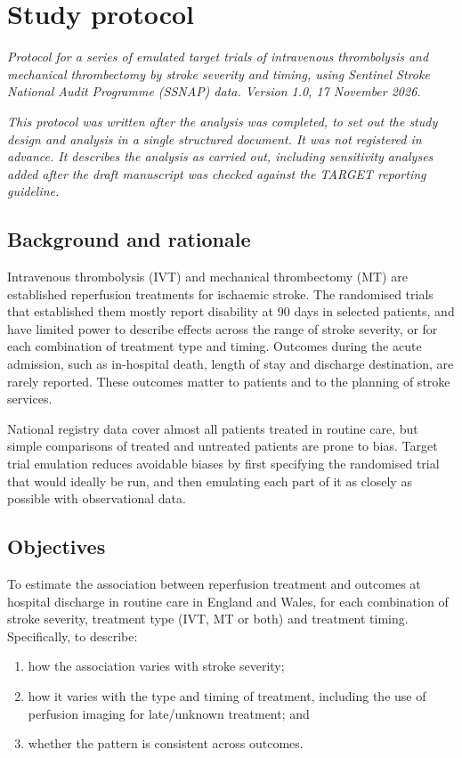 \section{Study protocol}\label{sec:protocol}

\noindent\textit{Protocol for a series of emulated target trials of intravenous thrombolysis and mechanical thrombectomy by stroke severity and timing, using Sentinel Stroke National Audit Programme (SSNAP) data. Version 1.0, 17 November 2026.}

\noindent\textit{This protocol was written after the analysis was completed, to set out the study design and analysis in a single structured document. It was not registered in advance. It describes the analysis as carried out, including sensitivity analyses added after the draft manuscript was checked against the TARGET reporting guideline.}

\subsection{Background and rationale}

Intravenous thrombolysis (IVT) and mechanical thrombectomy (MT) are established reperfusion treatments for ischaemic stroke\cite{emberson_effect_2014, goyal_endovascular_2016}. The randomised trials that established them mostly report disability at 90 days in selected patients, and have limited power to describe effects across the range of stroke severity, or for each combination of treatment type and timing. Outcomes during the acute admission, such as in-hospital death, length of stay and discharge destination, are rarely reported. These outcomes matter to patients and to the planning of stroke services.

National registry data cover almost all patients treated in routine care, but simple comparisons of treated and untreated patients are prone to bias. Target trial emulation reduces avoidable biases by first specifying the randomised trial that would ideally be run, and then emulating each part of it as closely as possible with observational data\cite{hernan_using_2016, hernan_target_2022}.

\subsection{Objectives}

To estimate the association between reperfusion treatment and outcomes at hospital discharge in routine care in England and Wales, for each combination of stroke severity, treatment type (IVT, MT or both) and treatment timing. Specifically, to describe:
\begin{enumerate}
\item how the association varies with stroke severity;
\item how it varies with the type and timing of treatment, including the use of perfusion imaging for late/unknown treatment; and
\item whether the pattern is consistent across outcomes.
\end{enumerate}

